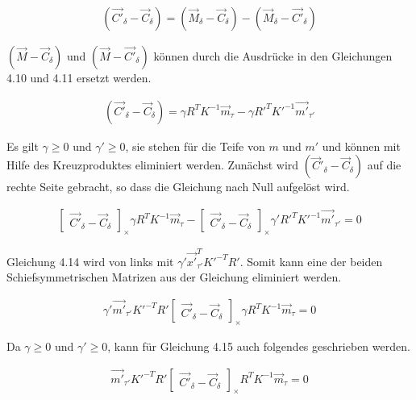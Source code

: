 \begin{gather}
(\vec{C'}_\delta - \vec{C}_\delta) = (\vec{M}_\delta - \vec{C}_\delta) - (\vec{M}_\delta - \vec{C'}_\delta)
\end{gather}

$(\vec{M}-\vec{C}_\delta)$ und $(\vec{M} - \vec{C'}_\delta)$ können durch die Ausdrücke in den Gleichungen 4.10 und 4.11 ersetzt werden.

\begin{gather}
(\vec{C'}_\delta - \vec{C}_\delta) = \gamma R^TK^{-1}\vec{m}_\tau - \gamma R'^TK'^{-1}\vec{m'}_{\tau'}
\end{gather}

Es gilt $\gamma \geq 0$ und $\gamma' \geq 0$, sie stehen für die Teife von $m$ und $m'$ und können mit Hilfe des Kreuzproduktes eliminiert werden\cite{Elements}. Zunächst wird $(\vec{C}'_\delta - \vec{C}_\delta)$ auf die rechte Seite gebracht, so dass die Gleichung nach Null aufgelöst wird.


\begin{gather}
\begin{bmatrix}\vec{C'}_\delta - \vec{C}_\delta\end{bmatrix}_\times \gamma R^TK^{-1}\vec{m}_\tau - 
\begin{bmatrix}	\vec{C'}_\delta - \vec{C}_\delta\end{bmatrix}_\times \gamma' R'^TK'^{-1} \vec{m'}_{\tau'} =  0
\end{gather}

Gleichung 4.14 wird von links mit $\gamma' \vec{x'}^T_{\tau'}K'^{-T}R'$. Somit kann eine der beiden Schiefsymmetrischen Matrizen aus der Gleichung eliminiert werden. 

\begin{gather}
\gamma' \vec{m'}_{\tau'} K'^{-T}R' \begin{bmatrix}	\vec{C'}_\delta - \vec{C}_\delta\end{bmatrix}_\times \gamma R^TK^{-1}\vec{m}_\tau = 0
\end{gather}

Da $\gamma \geq 0$ und $\gamma' \geq 0$, kann für Gleichung 4.15 auch folgendes geschrieben werden.

\begin{gather}
\vec{m'}_{\tau'} K'^{-T}R' \begin{bmatrix}	\vec{C'}_\delta - \vec{C}_\delta\end{bmatrix}_\times R^TK^{-1}\vec{m}_\tau = 0
\end{gather}

